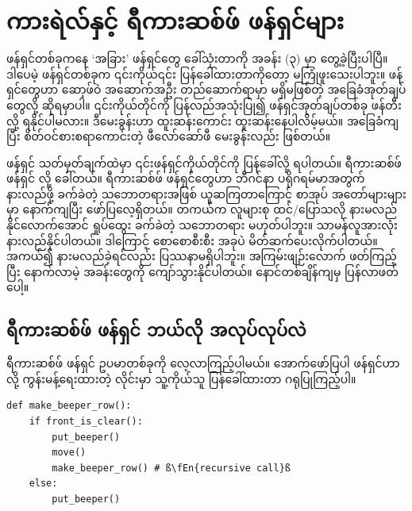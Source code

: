 \chapter{ကားရဲလ်နှင့် ရီကားဆစ်ဖ် ဖန်ရှင်များ}

ဖန်ရှင်တစ်ခုကနေ ‘အခြား’ ဖန်ရှင်တွေ ခေါ်သုံးတာကို အခန်း (၃) မှာ တွေ့ခဲ့ပြီးပါပြီ။ ဒါပေမဲ့ ဖန်ရှင်တစ်ခုက ၎င်းကိုယ်၎င်း ပြန်ခေါ်ထားတာကိုတော့ မကြုံဖူးသေးပါဘူး။ ဖန်ရှင်တွေဟာ ဆော့ဖ်ဝဲ အဆောက်အဦး တည်ဆောက်ရာမှာ မရှိမဖြစ်တဲ့ အခြေခံအုတ်ချပ်တွေလို့ ဆိုရမှာပါ။  ၎င်းကိုယ်တိုင်ကို ပြန်လည်အသုံးပြု၍ ဖန်ရှင်အုတ်ချပ်တစ်ခု ဖန်တီးလို့ ရနိုင်ပါမလား။ ဒီမေးခွန်းဟာ  ထူးဆန်းကောင်း ထူးဆန်းနေပါလိမ့်မယ်။ အခြေခံကျပြီး စိတ်ဝင်စားစရာကောင်းတဲ့ ဖီလော်ဆော်ဖီ မေးခွန်းလည်း ဖြစ်တယ်။



ဖန်ရှင် သတ်မှတ်ချက်ထဲမှာ ၎င်းဖန်ရှင်ကိုယ်တိုင်ကို ပြန်ခေါ်လို့ ရပါတယ်။ ရီကားဆစ်ဖ် ဖန်ရှင်  လို့ ခေါ်တယ်။ ရီကားဆစ်ဖ် ဖန်ရှင်တွေဟာ ဘီဂင်နာ ပရိုဂရမ်မာအတွက် နားလည်ဖို့ ခက်ခဲတဲ့ သဘောတရားအဖြစ် ယူဆကြတာကြောင့် စာအုပ် အတော်များများမှာ  နောက်ကျပြီး ဖော်ပြလေ့ရှိတယ်။ တကယ်က လူများစု ထင်/ပြောသလို နားမလည်နိုင်လောက်အောင် ရှုပ်ထွေး ခက်ခဲတဲ့ သဘောတရား မဟုတ်ပါဘူး။ သာမန်လူအားလုံး နားလည်နိုင်ပါတယ်။ ဒါကြောင့် စောစောစီးစီး အခုပဲ မိတ်ဆက်ပေးလိုက်ပါတယ်။ အကယ်၍ နားမလည်ခဲ့ရင်လည်း ပြဿနာမရှိပါဘူး။ အကြမ်းဖျဉ်းလောက် ဖတ်ကြည့်ပြီး နောက်လာမဲ့ အခန်းတွေကို ကျော်သွားနိုင်ပါတယ်။ နောင်တစ်ချိန်ကျမှ ပြန်လာဖတ်ပေါ့။

\section{ရီကားဆစ်ဖ် ဖန်ရှင် ဘယ်လို အလုပ်လုပ်လဲ}
 ရီကားဆစ်ဖ် ဖန်ရှင် ဥပမာတစ်ခုကို လေ့လာကြည့်ပါမယ်။ အောက်ဖော်ပြပါ ဖန်ရှင်ဟာ  လို့ ကွန်းမန့်ရေးထားတဲ့ လိုင်းမှာ သူ့ကိုယ်သူ ပြန်ခေါ်ထားတာ ဂရုပြုကြည့်ပါ။ 
%
\setlength{\fboxsep}{0pt}
\begin{verbatim}
def make_beeper_row():
    if front_is_clear():
        put_beeper()
        move()
        make_beeper_row() # ß\fEn{recursive call}ß
    else:
        put_beeper()
\end{verbatim}
%

